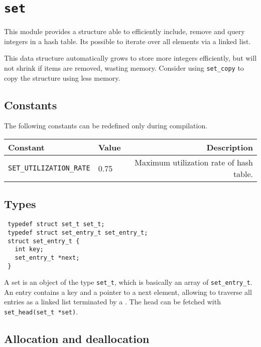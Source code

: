 \section{\texttt{set}}

This module provides a structure able to efficiently include, remove and query integers in
a hash table. Its possible to iterate over all elements via a linked list.

 This data structure automatically grows to store more integers efficiently, but will not
shrink if items are removed, wasting memory. Consider using \lstinline!set_copy! to copy
the structure using less memory.

\subsection{Constants}

The following constants can be redefined only during compilation.

\begin{table}[!hb]
 \begin{tabular}{|llr|}
  \hline
  Constant                         & Value & Description \\ \hline
  \lstinline!SET_UTILIZATION_RATE! & 0.75  & Maximum utilization rate of hash table. \\
  \hline
 \end{tabular}
\end{table}

\subsection{Types}

\begin{lstlisting}
 typedef struct set_t set_t;
 typedef struct set_entry_t set_entry_t;
 struct set_entry_t {
   int key;
   set_entry_t *next;
 }
\end{lstlisting}

A set is an object of the type \lstinline!set_t!, which is basically an array of \lstinline!set_entry_t!.
An entry contains a key and a pointer to a next element, allowing to traverse all entries as a linked
list terminated by a \NULL. The head can be fetched with \lstinline!set_head(set_t *set)!.

\subsection{Allocation and deallocation}

